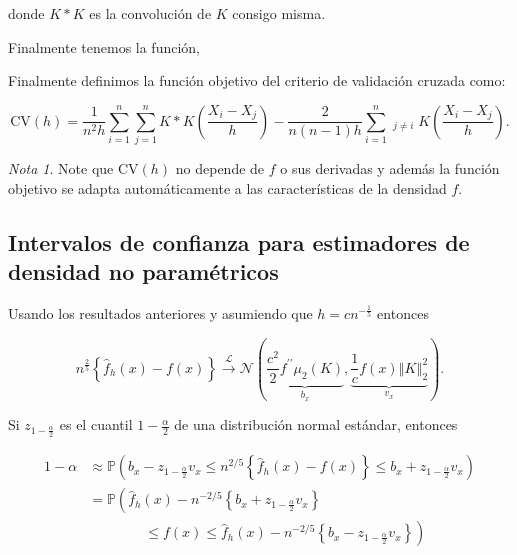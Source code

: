\documentclass[
  12pt,
]{book}
\theoremstyle{definition}
\theoremstyle{definition}
\theoremstyle{definition}
\theoremstyle{definition}
\theoremstyle{remark}
\newtheorem*{remark}{Nota}
\begin{document}
donde \(K*K\) es la convolución de \(K\) consigo misma.

Finalmente tenemos la función,

Finalmente definimos la función objetivo del criterio de validación cruzada como:

\[
\mathrm{CV}(h)=\frac{1}{n^{2}h}\sum_{i=1}^{n}\sum_{j=1}^{n}K*K\left(\frac{X_{i}-X_{j}}{h}\right)-\frac{2}{n(n-1)h}\sum_{i=1}^{n}\mathop{\sum_{j=1}^{n}}_{j\neq i}K\left( \frac{X_{i}-X_{j}}{h} \right).
\]

\begin{remark}
Note que \(\mathrm{CV}(h)\) no depende de \(f\) o sus derivadas y además la función objetivo se adapta automáticamente a las características de la densidad \(f\).
\end{remark}

\hypertarget{intervalos-de-confianza-para-estimadores-de-densidad-no-paramuxe9tricos}{%
\subsection{Intervalos de confianza para estimadores de densidad no paramétricos}\label{intervalos-de-confianza-para-estimadores-de-densidad-no-paramuxe9tricos}}

Usando los resultados anteriores y asumiendo que \(h=cn^{-\frac{1}{5}}\)
entonces

\begin{equation*}
n^{\frac{2}{5}} \left\{ \hat{f}_{h}(x) -f(x)\right\}
\xrightarrow{\mathcal{L}} \mathcal{N}\left(\underbrace{\frac{c^{2}}{2} f^{\prime\prime}
\mu_{2}(K)}_{b_{x}}, \underbrace{\frac{1}{c}f(x) \left\Vert K \right\Vert_{2}^{2}}_{v_{x}}\right).
\end{equation*}

Si \(z_{1-\frac{\alpha}{2}}\) es el cuantil \(1-\frac{\alpha}{2}\) de una
distribución normal estándar, entonces

\begin{align*}
1-\alpha
& \approx \mathbb{P}\left(b_{x}-z_{1-\frac{\alpha}{2}} v_{x} \leq n^{2 / 5}\left\{\widehat{f}_{h}(x)-f(x)\right\} \leq b_{x}+z_{1-\frac{\alpha}{2}} v_{x}\right) \\
& =\mathbb{P}\left(\widehat{f}_{h}(x)-n^{-2 / 5}\left\{b_{x}+z_{1-\frac{\alpha}{2}} v_{x}\right\}\right.                                                         \\
& \qquad\qquad \left. \leq f(x)\leq \hat{f}_{h}(x)-n^{-2 / 5}\left\{b_{x}-z_{1-\frac{\alpha}{2}} v_{x}\right\}\right)
\end{align*}
\end{document}
